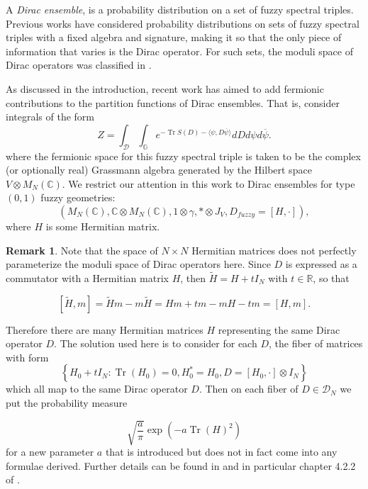 \documentclass[10pt]{article}
\newcommand{\cc}{\mathbb{C}}
\theoremstyle{plain}
\theoremstyle{definition}
\newtheorem{remark}[definition]{Remark}
\DeclareMathOperator{\tr}{Tr}
\theoremstyle{plain}
\begin{document}
 A \textit{Dirac ensemble}, is a probability distribution on a set of fuzzy spectral triples. Previous works have considered probability distributions on sets of fuzzy spectral triples with a fixed algebra and signature, making it so that the only piece of information that varies is the Dirac operator. For such sets, the moduli space of Dirac operators was classified in \cite{barrett2015matrix}. 

  As discussed in the introduction, recent work \cite{barrett2024,khalkhali2024large,verhoeven2023geometry} has aimed to add fermionic contributions to the partition functions of Dirac ensembles. That is, consider integrals of the form
 \begin{equation}
    Z = \int_{\mathcal{D}}\int_{\mathbb{G}} e^{-\tr S(D) - \langle \psi, D\overline{\psi}\rangle } dD d\psi d\overline{\psi}  . 
\end{equation}
where the fermionic space for this fuzzy spectral triple is taken to be the complex (or optionally real) Grassmann algebra generated by the Hilbert space $V \otimes  M_{N} (\mathbb{C}) $. We restrict our attention in this work to Dirac ensembles for type $(0,1)$ fuzzy geometries: 
$$(M_N(\cc),\cc \otimes M_{N}(\cc),1\otimes \gamma,*\otimes J_V,D_{fuzzy} = [H,\cdot]),$$
where $H$ is some Hermitian matrix.
\begin{remark}
 Note that the space of $N\times N$ Hermitian matrices does not perfectly parameterize the moduli space of Dirac operators here. Since $D$ is expressed as a commutator with a Hermitian matrix $H$, then $\widetilde{H}=H+t I_N$ with $t \in \mathbb{R}$, so that

$$
[\widetilde{H}, m]=\widetilde{H} m-m \widetilde{H}=H m+t m-m H-t m=[H, m] .
$$


Therefore there are many Hermitian matrices $H$ representing the same Dirac operator $D$. The solution used here is to consider for each $D$, the fiber of matrices with form $$\left\{H_0+t I_N: \operatorname{Tr}\left(H_0\right)=0, H_0^*=H_0, D=\left[H_0, \cdot\right] \otimes I_N\right\}$$ which all map to the same Dirac operator $D$. Then on each fiber of $D \in \mathcal{D}_N$ we put the probability measure

$$
\sqrt{\frac{a}{\pi}} \exp \left(-a \operatorname{Tr}(H)^2\right) 
$$
for a new parameter $a$ that is introduced but does not in fact come into any formulae derived. Further details can be found in \cite{khalkhali2024large} and in particular chapter 4.2.2 of \cite{verhoeven2023geometry}. 
\end{remark}
\end{document}

